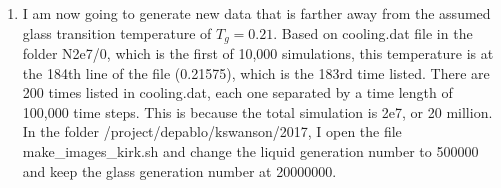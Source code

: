\documentclass[12pt,reqno]{amsart}
\numberwithin{equation}{section}
\begin{document}
\begin{enumerate}
\item I am now going to generate new data that is farther away from the assumed glass transition temperature of $T_g = 0.21$.  Based on cooling.dat file in the folder N2e7/0, which is the first of 10,000 simulations, this temperature is at the 184th line of the file (0.21575), which is the 183rd time listed.  There are 200 times listed in cooling.dat, each one separated by a time length of 100,000 time steps.  This is because the total simulation is 2e7, or 20 million.  In the folder /project/depablo/kswanson/2017, I open the file make\_images\_kirk.sh and change the liquid generation number to 500000 and keep the glass generation number at 20000000.   



\end{enumerate}
\end{document}
